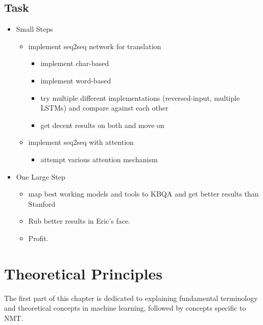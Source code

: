 \documentclass[10pt,a4paper,titlepage,twoside,english]{zhawreprt}
\begin{document}
\section{Task}\label{sec:Task}
\begin{itemize}
	\item Small Steps
	\begin{itemize}
		\item implement seq2seq network for translation
		\begin{itemize}
			\item implement char-based
			\item implement word-based
			\item try multiple different implementations (reversed-input, multiple LSTMs) and compare against each other
			\item get decent results on both and move on
		\end{itemize}
		\item implement seq2seq with attention
		\begin{itemize}
			\item attempt various attention mechanism
		\end{itemize}
	\end{itemize}
	\item One Large Step
	\begin{itemize}
		\item map best working models and tools to KBQA and get better results than Stanford
		\item Rub better results in Eric's face.
		\item Profit.
	\end{itemize}
\end{itemize}

\chapter{Theoretical Principles}\label{chp:TheoreticalPrinciples}
The first part of this chapter is dedicated to explaining fundamental terminology and theoretical concepts in machine learning, followed by concepts specific to NMT. 
\end{document}
